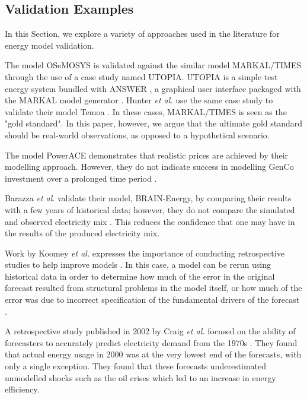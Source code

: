 \subsection{Validation Examples}

In this Section, we explore a variety of approaches used in the literature for energy model validation.

The model OSeMOSYS \cite{Howells2011} is validated against the similar model MARKAL\slash TIMES through the use of a case study named UTOPIA. UTOPIA is a simple test energy system bundled with ANSWER \cite{Hunter2013}, a graphical user interface packaged with the MARKAL model generator \cite{Noble2004}. Hunter \textit{et al.} use the same case study to validate their model Temoa \cite{Hunter2013}. In these cases, MARKAL\slash TIMES is seen as the "gold standard". In this paper, however, we argue that the ultimate gold standard should be real-world observations, as opposed to a hypothetical scenario.

The model PowerACE demonstrates that realistic prices are achieved by their modelling approach. However, they do not indicate success in modelling GenCo investment over a prolonged time period \cite{Ringler2012}.

Barazza \textit{et al}. validate their model, BRAIN-Energy, by comparing their results with a few years of historical data; however, they do not compare the simulated and observed electricity mix \cite{Barazza2020}. This reduces the confidence that one may have in the results of the produced electricity mix.

Work by Koomey \textit{et al.} expresses the importance of conducting retrospective studies to help improve models \cite{Koomey2003}. In this case, a model can be rerun using historical data in order to determine how much of the error in the original forecast resulted from structural problems in the model itself, or how much of the error was due to incorrect specification of the fundamental drivers of the forecast \cite{Koomey2003}.

A retrospective study published in 2002 by Craig \textit{et al.} focused on the ability of forecasters to accurately predict electricity demand from the 1970s \cite{Craig2002}. They found that actual energy usage in 2000 was at the very lowest end of the forecasts, with only a single exception. They found that these forecasts underestimated unmodelled shocks such as the oil crises which led to an increase in energy efficiency.

